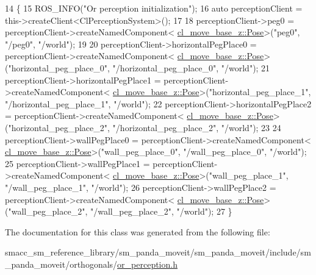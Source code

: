 \begin{DoxyCode}
14     \{
15         ROS\_INFO(\textcolor{stringliteral}{"Or perception initialization"});
16         \textcolor{keyword}{auto} perceptionClient = this->createClient<ClPerceptionSystem>();
17 
18         perceptionClient->peg0 = perceptionClient->createNamedComponent<
      \hyperlink{classcl__move__base__z_1_1Pose}{cl\_move\_base\_z::Pose}>(\textcolor{stringliteral}{"peg0"}, \textcolor{stringliteral}{"/peg0"}, \textcolor{stringliteral}{"/world"});
19 
20         perceptionClient->horizontalPegPlace0 = perceptionClient->createNamedComponent<
      \hyperlink{classcl__move__base__z_1_1Pose}{cl\_move\_base\_z::Pose}>(\textcolor{stringliteral}{"horizontal\_peg\_place\_0"}, \textcolor{stringliteral}{"/horizontal\_peg\_place\_0"}, \textcolor{stringliteral}{"/world"});
21         perceptionClient->horizontalPegPlace1 = perceptionClient->createNamedComponent<
      \hyperlink{classcl__move__base__z_1_1Pose}{cl\_move\_base\_z::Pose}>(\textcolor{stringliteral}{"horizontal\_peg\_place\_1"}, \textcolor{stringliteral}{"/horizontal\_peg\_place\_1"}, \textcolor{stringliteral}{"/world"});
22         perceptionClient->horizontalPegPlace2 = perceptionClient->createNamedComponent<
      \hyperlink{classcl__move__base__z_1_1Pose}{cl\_move\_base\_z::Pose}>(\textcolor{stringliteral}{"horizontal\_peg\_place\_2"}, \textcolor{stringliteral}{"/horizontal\_peg\_place\_2"}, \textcolor{stringliteral}{"/world"});
23 
24         perceptionClient->wallPegPlace0 = perceptionClient->createNamedComponent<
      \hyperlink{classcl__move__base__z_1_1Pose}{cl\_move\_base\_z::Pose}>(\textcolor{stringliteral}{"wall\_peg\_place\_0"}, \textcolor{stringliteral}{"/wall\_peg\_place\_0"}, \textcolor{stringliteral}{"/world"});
25         perceptionClient->wallPegPlace1 = perceptionClient->createNamedComponent<
      \hyperlink{classcl__move__base__z_1_1Pose}{cl\_move\_base\_z::Pose}>(\textcolor{stringliteral}{"wall\_peg\_place\_1"}, \textcolor{stringliteral}{"/wall\_peg\_place\_1"}, \textcolor{stringliteral}{"/world"});
26         perceptionClient->wallPegPlace2 = perceptionClient->createNamedComponent<
      \hyperlink{classcl__move__base__z_1_1Pose}{cl\_move\_base\_z::Pose}>(\textcolor{stringliteral}{"wall\_peg\_place\_2"}, \textcolor{stringliteral}{"/wall\_peg\_place\_2"}, \textcolor{stringliteral}{"/world"});
27     \}
\end{DoxyCode}


The documentation for this class was generated from the following file\+:\begin{DoxyCompactItemize}
\item 
smacc\+\_\+sm\+\_\+reference\+\_\+library/sm\+\_\+panda\+\_\+moveit/sm\+\_\+panda\+\_\+moveit/include/sm\+\_\+panda\+\_\+moveit/orthogonals/\hyperlink{sm__panda__moveit_2sm__panda__moveit_2include_2sm__panda__moveit_2orthogonals_2or__perception_8h}{or\+\_\+perception.\+h}\end{DoxyCompactItemize}
